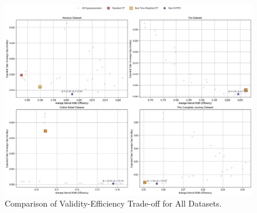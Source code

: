\begin{figure}[t]
    \centering
    \includegraphics[width=\linewidth]{images/tradeoff_plots_combined.png}
    \caption{Comparison of Validity-Efficiency Trade-off for All Datasets.}
    \label{fig:tradeoff_plots_combined}
\end{figure}
